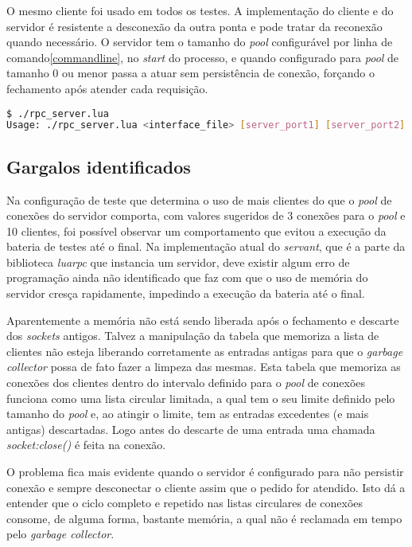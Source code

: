 \documentclass[11pt]{article}
\begin{document}
O mesmo cliente foi usado em todos os testes. A implementação do cliente e do
servidor é resistente a desconexão da outra ponta e pode tratar da reconexão
quando necessário. O servidor tem o tamanho do \textit{pool} configurável por
linha de comando\ref{commandline}, no \textit{start} do processo, e quando
configurado para \textit{pool} de tamanho 0 ou menor passa a atuar sem
persistência de conexão, forçando o fechamento após atender cada requisição.

\begin{lstlisting}[label={commandline},language=sh,caption=Linha de comando]
$ ./rpc_server.lua
Usage: ./rpc_server.lua <interface_file> [server_port1] [server_port2] [pool_size]
\end{lstlisting}

\subsection{Gargalos identificados}\label{subsec:bottle}

Na configuração de teste que determina o uso de mais clientes do que o
\textit{pool} de conexões do servidor comporta, com valores sugeridos de 3
conexões para o \textit{pool} e 10 clientes, foi possível observar um
comportamento que evitou a execução da bateria de testes até o final. Na
implementação atual do \textit{servant}, que é a parte da biblioteca
\textit{luarpc} que instancia um servidor, deve existir algum erro de
programação ainda não identificado que faz com que o uso de memória do servidor
cresça rapidamente, impedindo a execução da bateria até o final.

Aparentemente a memória não está sendo liberada após o fechamento e descarte
dos \textit{sockets} antigos. Talvez a manipulação da tabela que memoriza a
lista de clientes não esteja liberando corretamente as entradas antigas para
que o \textit{garbage collector} possa de fato fazer a limpeza das mesmas.
Esta tabela que memoriza as conexões dos clientes dentro do intervalo definido
para o \textit{pool} de conexões funciona como uma lista circular limitada, a
qual tem o seu limite definido pelo tamanho do \textit{pool} e, ao atingir o
limite, tem as entradas excedentes (e mais antigas) descartadas. Logo antes do
descarte de uma entrada uma chamada \textit{socket:close()} é feita na conexão.

O problema fica mais evidente quando o servidor é configurado para não
persistir conexão e sempre desconectar o cliente assim que o pedido for
atendido. Isto dá a entender que o ciclo completo e repetido nas listas
circulares de conexões consome, de alguma forma, bastante memória, a qual não é
reclamada em tempo pelo \textit{garbage collector}.
\end{document}
